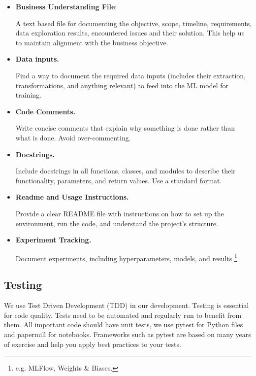 \begin{itemize}
    \item \textbf{Business Understanding File}:
    
    \noindent
    A text based file for documenting the objective, scope,
    timeline, requirements, data exploration results,
    encountered issues and their solution. This help us to maintain 
    alignment with the business objective.


    \item \textbf{Data inputs.}
    
    \noindent
    Find a way to document the required data inputs (includes their
    extraction, transformations, and anything relevant) to feed
    into the ML model for training.


    \item \textbf{Code Comments.}
        
    \noindent
    Write concise comments that explain why something is done
    rather than what is done. Avoid over-commenting.


    \item \textbf{Docstrings.}
       
    \noindent
    Include docstrings in all functions, classes, and modules to 
    describe their functionality, parameters, and return values.
    Use a standard format.


    \item \textbf{Readme and Usage Instructions.}
        
    \noindent
    Provide a clear README file with instructions on how to set up
    the environment, run the code, and understand the project's
    structure.


    \item \textbf{Experiment Tracking.}
        
    \noindent
    Document experiments, including hyperparameters, models, and
    results
    \footnote{
        e.g. MLFlow, Weights \& Biases.
    }
\end{itemize}



\subsection{Testing}
We use Test Driven Development (TDD) in our development.
Testing is essential for code quality.
Tests need to be automated and regularly run to benefit from them.
All important code should have unit tests, we use pytest for
Python files and papermill for notebooks.
Frameworks such as pytest are based on many years of exercise and
help you apply best practices to your tests.


